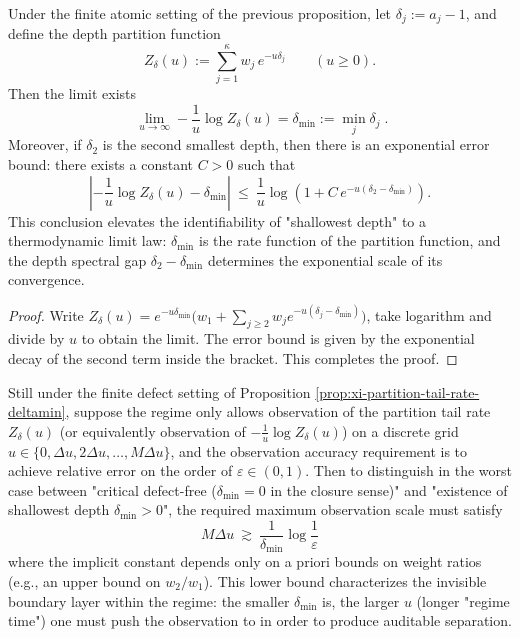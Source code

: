 \begin{proposition}\label{prop:xi-partition-tail-rate-deltamin}
Under the finite atomic setting of the previous proposition, let \(\delta_j:=a_j-1\), and define the depth partition function
\[
Z_\delta(u):=\sum_{j=1}^{\kappa} w_j\,e^{-u\delta_j}\qquad(u\ge 0).
\]
Then the limit exists
\[
\boxed{\;
\lim_{u\to\infty}-\frac{1}{u}\log Z_\delta(u)=\delta_{\min}:=\min_j \delta_j\; }.
\]
Moreover, if \(\delta_2\) is the second smallest depth, then there is an exponential error bound: there exists a constant \(C>0\) such that
\[
\left|-\frac{1}{u}\log Z_\delta(u)-\delta_{\min}\right|
\ \le\ \frac{1}{u}\log\!\left(1+C\,e^{-u(\delta_2-\delta_{\min})}\right).
\]
This conclusion elevates the identifiability of "shallowest depth" to a thermodynamic limit law: \(\delta_{\min}\) is the rate function of the partition function, and the depth spectral gap \(\delta_2-\delta_{\min}\) determines the exponential scale of its convergence.
\end{proposition}
\begin{proof}
Write
\(
Z_\delta(u)=e^{-u\delta_{\min}}\bigl(w_1+\sum_{j\ge 2} w_j e^{-u(\delta_j-\delta_{\min})}\bigr)
\),
take logarithm and divide by \(u\) to obtain the limit.
The error bound is given by the exponential decay of the second term inside the bracket. This completes the proof.
\end{proof}
\begin{corollary}\label{cor:xi-partition-tail-min-scale-lower-bound}
Still under the finite defect setting of Proposition \ref{prop:xi-partition-tail-rate-deltamin}, suppose the regime only allows observation of the partition tail rate \(Z_\delta(u)\) (or equivalently observation of \(-\frac{1}{u}\log Z_\delta(u)\)) on a discrete grid
\(
u\in\{0,\Delta u,2\Delta u,\dots,M\Delta u\}
\),
and the observation accuracy requirement is to achieve relative error on the order of \(\varepsilon\in(0,1)\).
Then to distinguish in the worst case between "critical defect-free (\(\delta_{\min}=0\) in the closure sense)" and "existence of shallowest depth \(\delta_{\min}>0\)", the required maximum observation scale must satisfy
\[
\boxed{\;
M\Delta u\ \gtrsim\ \frac{1}{\delta_{\min}}\log\!\frac{1}{\varepsilon}\;}
\]
where the implicit constant depends only on a priori bounds on weight ratios (e.g., an upper bound on \(w_2/w_1\)).
This lower bound characterizes the invisible boundary layer within the regime: the smaller \(\delta_{\min}\) is, the larger \(u\) (longer "regime time") one must push the observation to in order to produce auditable separation.
\end{corollary}
